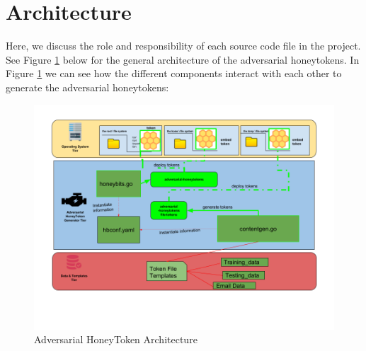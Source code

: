 \documentclass[grad,lot,lof,11pt,oneside,onehalfspace]{RUthesis}
\begin{document}
\section{Architecture}
Here, we discuss the role and responsibility of each source code file in the project. See Figure \ref{fig:AHTarchitecture} below for the general architecture of the adversarial honeytokens. In Figure  \ref{fig:AHTarchitecture} we can see how the different components interact with each other to generate the adversarial honeytokens:
\begin{figure}[th]
	\centering
	\includegraphics[width=0.7\linewidth]{"Images/Chapter 5/AHTarchitecture"}
	\caption{Adversarial HoneyToken Architecture}
	\label{fig:AHTarchitecture}
\end{figure}
\end{document}
